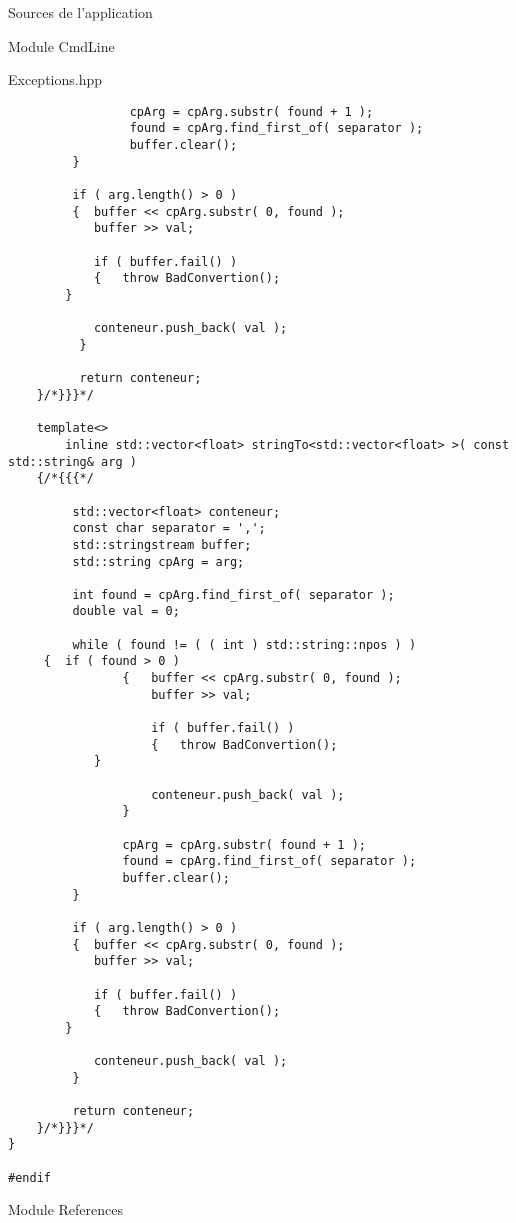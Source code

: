 \documentclass{article}
\begin{document}
\begin{section}{Sources de l'application}
\begin{subsection}{Module CmdLine}
\begin{paragraph}{Exceptions.hpp}
\begin{verbatim}
              	 cpArg = cpArg.substr( found + 1 );
              	 found = cpArg.find_first_of( separator );
              	 buffer.clear();
         }

         if ( arg.length() > 0 ) 
         {	buffer << cpArg.substr( 0, found );
           	buffer >> val;

         	if ( buffer.fail() )
           	{	throw BadConvertion();
		}
           
           	conteneur.push_back( val );
          }

          return conteneur;
    }/*}}}*/
    
    template<>
        inline std::vector<float> stringTo<std::vector<float> >( const std::string& arg )
    {/*{{{*/

         std::vector<float> conteneur;
         const char separator = ',';
         std::stringstream buffer;
         std::string cpArg = arg;

         int found = cpArg.find_first_of( separator );
         double val = 0;

         while ( found != ( ( int ) std::string::npos ) ) 
	 {	if ( found > 0 ) 
                {	buffer << cpArg.substr( 0, found );
                   	buffer >> val;
                   
                   	if ( buffer.fail() )
                   	{	throw BadConvertion();
			}

                   	conteneur.push_back( val );
              	}

              	cpArg = cpArg.substr( found + 1 );
              	found = cpArg.find_first_of( separator );
              	buffer.clear();
         }

         if ( arg.length() > 0 )
         {	buffer << cpArg.substr( 0, found );
           	buffer >> val;

           	if ( buffer.fail() )
           	{	throw BadConvertion();
		}
           
           	conteneur.push_back( val );
         }

         return conteneur;
    }/*}}}*/
}

#endif
  \end{verbatim}
  \end{paragraph}

  \end{subsection}

  \newpage
  \begin{subsection}{Module References}
   

\end{subsection}
\end{section}
\end{document}
